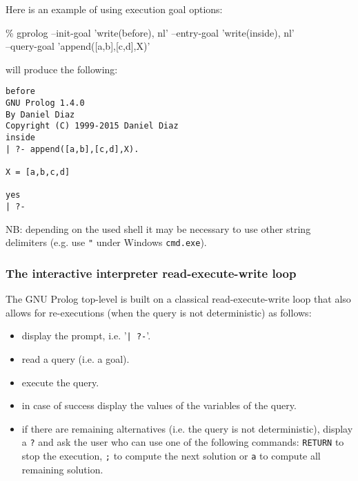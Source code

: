 Here is an example of using execution goal options:

\begin{Code}
\% gprolog --init-goal 'write(before), nl' --entry-goal 'write(inside), nl'\\
--query-goal 'append([a,b],[c,d],X)'
\end{Code}

will produce the following:

\begin{Code}
\begin{verbatim}
before
GNU Prolog 1.4.0
By Daniel Diaz
Copyright (C) 1999-2015 Daniel Diaz
inside
| ?- append([a,b],[c,d],X).

X = [a,b,c,d]

yes
| ?-
\end{verbatim}
\end{Code}

NB: depending on the used shell it may be necessary to use other string
delimiters (e.g. use \texttt{"} under Windows \texttt{cmd.exe}).

\subsubsection{The interactive interpreter read-execute-write loop}
The GNU Prolog top-level is built on a classical read-execute-write loop that
also allows for re-executions (when the query is not deterministic) as
follows:

\begin{itemize}

\item display the prompt, i.e. '\texttt{| ?-}'.

\item read a query (i.e. a goal).

\item execute the query.

\item in case of success display the values of the variables of the query.

\item if there are remaining alternatives (i.e. the query is not
deterministic), display a \texttt{?} and ask the user who can use one of the
following commands: \texttt{RETURN} to stop the execution, \texttt{;} to
compute the next solution or \texttt{a} to compute all remaining solution.

\end{itemize}

